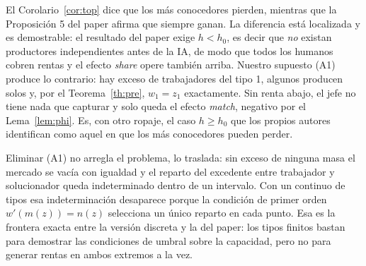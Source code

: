 \documentclass[11pt]{article}
\theoremstyle{plain}
\theoremstyle{definition}
\theoremstyle{remark}
\begin{document}
El Corolario~\ref{cor:top} dice que los más conocedores pierden, mientras que la Proposición 5 del
paper afirma que siempre ganan. La diferencia está localizada y es demostrable: el resultado del paper
exige $h<h_0$, es decir que \emph{no} existan productores independientes antes de la IA, de modo que
todos los humanos cobren rentas y el efecto \emph{share} opere también arriba. Nuestro supuesto (A1)
produce lo contrario: hay exceso de trabajadores del tipo 1, algunos producen solos y, por el
Teorema~\ref{th:pre}, $w_1=z_1$ exactamente. Sin renta abajo, el jefe no tiene nada que capturar y
solo queda el efecto \emph{match}, negativo por el Lema~\ref{lem:phi}. Es, con otro ropaje, el caso
$h\ge h_0$ que los propios autores identifican como aquel en que los más conocedores pueden perder.

Eliminar (A1) no arregla el problema, lo traslada: sin exceso de ninguna masa el mercado se vacía con
igualdad y el reparto del excedente entre trabajador y solucionador queda indeterminado dentro de un
intervalo. Con un continuo de tipos esa indeterminación desaparece porque la condición de primer orden
$w'(m(z))=n(z)$ selecciona un único reparto en cada punto. Esa es la frontera exacta entre la versión
discreta y la del paper: los tipos finitos bastan para demostrar las condiciones de umbral sobre la
capacidad, pero no para generar rentas en ambos extremos a la vez.
\end{document}
